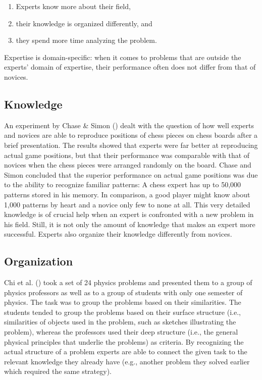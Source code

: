 \documentclass[
]{krantz}
\newcounter{none} %
\begin{document}
\begin{enumerate}
\def\labelenumi{\arabic{enumi}.}
\item
  Experts know more about their field,
\item
  their knowledge is organized differently, and
\item
  they spend more time analyzing the problem.
\end{enumerate}

Expertise is domain-specific: when it comes to problems that are outside the experts' domain of expertise, their performance often does not differ from that of novices.

\subsection*{Knowledge}\label{knowledge-1}


An experiment by Chase \& Simon () dealt with the question of how well experts and novices are able to reproduce positions of chess pieces on chess boards after a brief presentation. The results showed that experts were far better at reproducing actual game positions, but that their performance was comparable with that of novices when the chess pieces were arranged randomly on the board. Chase and Simon concluded that the superior performance on actual game positions was due to the ability to recognize familiar patterns: A chess expert has up to 50,000 patterns stored in his memory. In comparison, a good player might know about 1,000 patterns by heart and a novice only few to none at all. This very detailed knowledge is of crucial help when an expert is confronted with a new problem in his field. Still, it is not only the amount of knowledge that makes an expert more successful. Experts also organize their knowledge differently from novices.

\subsection*{Organization}\label{organization}


Chi et al. () took a set of 24 physics problems and presented them to a group of physics professors as well as to a group of students with only one semester of physics. The task was to group the problems based on their similarities. The students tended to group the problems based on their surface structure (i.e., similarities of objects used in the problem, such as sketches illustrating the problem), whereas the professors used their deep structure (i.e., the general physical principles that underlie the problems) as criteria. By recognizing the actual structure of a problem experts are able to connect the given task to the relevant knowledge they already have (e.g., another problem they solved earlier which required the same strategy).
\end{document}

